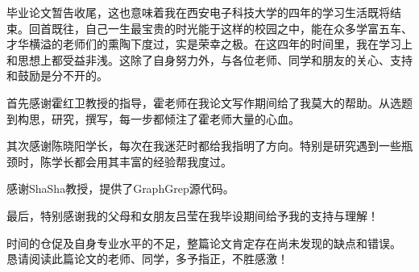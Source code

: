 \documentclass{XDBAthesis}
\begin{document}
\else
\fi

\begin{thanks}

毕业论文暂告收尾，这也意味着我在西安电子科技大学的四年的学习生活既将结束。回首既往，自己一生最宝贵的时光能于这样的校园之中，能在众多学富五车、才华横溢的老师们的熏陶下度过，实是荣幸之极。在这四年的时间里，我在学习上和思想上都受益非浅。这除了自身努力外，与各位老师、同学和朋友的关心、支持和鼓励是分不开的。

首先感谢霍红卫教授的指导，霍老师在我论文写作期间给了我莫大的帮助。从选题到构思，研究，撰写，每一步都倾注了霍老师大量的心血。

其次感谢陈晓阳学长，每次在我迷茫时都给我指明了方向。特别是研究遇到一些瓶颈时，陈学长都会用其丰富的经验帮我度过。


感谢ShaSha教授，提供了GraphGrep源代码。

最后，特别感谢我的父母和女朋友吕莹在我毕设期间给予我的支持与理解！

时间的仓促及自身专业水平的不足，整篇论文肯定存在尚未发现的缺点和错误。
恳请阅读此篇论文的老师、同学，多予指正，不胜感激！


\end{thanks}

\ifx\allfiles\undefined
%

\end{document}
